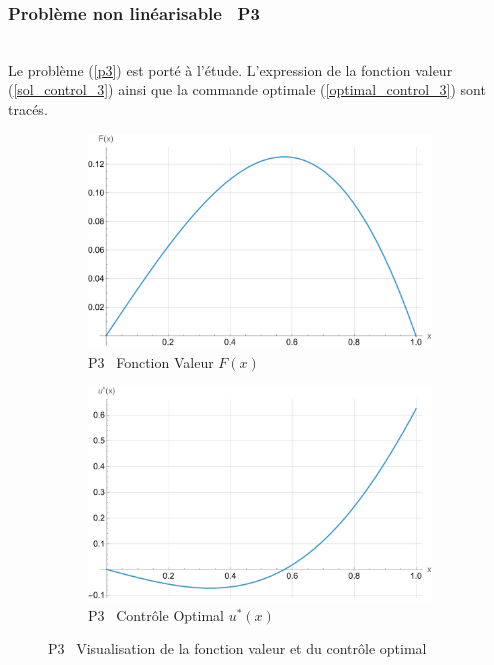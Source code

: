 \subsubsection{Problème non linéarisable \textemdash~P3}\phantom{}\\
Le problème (\ref{p3}) est porté à l'étude. L'expression de la fonction valeur (\ref{sol_control_3}) ainsi que la commande optimale (\ref{optimal_control_3}) sont tracés.
\begin{figure}[htb]
    \centering
    \begin{subfigure}{0.45\linewidth}
        \includegraphics[width=\linewidth]{img/validation/P3/p3_value.pdf}
        \caption{P3 \textemdash~Fonction Valeur $F(x)$}\label{fig:ValueVisualisation3}
    \end{subfigure}
    \hfill
    \begin{subfigure}{0.45\linewidth}
        \includegraphics[width=\linewidth]{img/validation/P3/p3_control.pdf}
        \caption{P3 \textemdash~Contrôle Optimal $u^*(x)$}\label{fig:ControlVisualisation3}
    \end{subfigure}
    \caption{P3 \textemdash~Visualisation de la fonction valeur et du contrôle optimal}\label{fig:ValueControlComparison3}
\end{figure}

